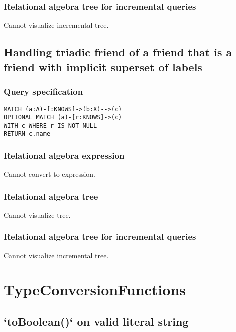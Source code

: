 \subsubsection*{Relational algebra tree for incremental queries}

Cannot visualize incremental tree.

\subsection{Handling triadic friend of a friend that is a friend with implicit superset of labels}

\subsubsection*{Query specification}

\begin{lstlisting}
MATCH (a:A)-[:KNOWS]->(b:X)-->(c)
OPTIONAL MATCH (a)-[r:KNOWS]->(c)
WITH c WHERE r IS NOT NULL
RETURN c.name
\end{lstlisting}

\subsubsection*{Relational algebra expression}

Cannot convert to expression.

\subsubsection*{Relational algebra tree}

Cannot visualize tree.

\subsubsection*{Relational algebra tree for incremental queries}

Cannot visualize incremental tree.

\section{TypeConversionFunctions}

\subsection{`toBoolean()` on valid literal string}

